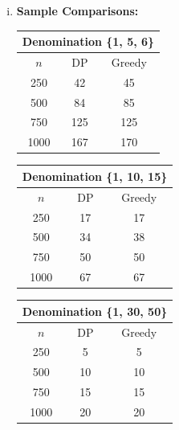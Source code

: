 \documentclass[11pt]{article}
\begin{document}
\begin{enumerate}
\begin{enumerate}[(a)]
\begin{enumerate}[(i)]
				\item
					\textbf{Sample Comparisons:} \\
						\hspace*{.5cm}
						\begin{tabular}{ |c||c|c| }
							\hline
							\multicolumn{3}{|c|}{\textbf{Denomination \{1, 5, 6\}}} \\
							\hline
							$ n $ & DP & Greedy \\
							\hline
							250 & 42 & 45 \\
							\hline
							500 & 84 & 85 \\ 
							\hline
							750 & 125 & 125 \\ 
							\hline
							1000 & 167 & 170 \\
							\hline
						\end{tabular}
						\vspace{5mm}
						
						\hspace*{.5cm}
						\begin{tabular}{ |c||c|c| }
							\hline
							\multicolumn{3}{|c|}{\textbf{Denomination \{1, 10, 15\}}} \\
							\hline
							$ n $ & DP & Greedy \\
							\hline
							250 & 17 & 17 \\
							\hline
							500 & 34 & 38 \\ 
							\hline
							750 & 50 & 50 \\ 
							\hline
							1000 & 67 & 67 \\
							\hline
						\end{tabular}
						\vspace{5mm}

						\hspace*{.5cm}
						\begin{tabular}{ |c||c|c| }
							\hline
							\multicolumn{3}{|c|}{\textbf{Denomination \{1, 30, 50\}}} \\
							\hline
							$ n $ & DP & Greedy \\
							\hline
							250 & 5 & 5 \\
							\hline
							500 & 10 & 10 \\ 
							\hline
							750 & 15 & 15 \\ 
							\hline
							1000 & 20 & 20 \\
							\hline
						\end{tabular}
						\vspace{5mm}
					

\end{enumerate}
\end{enumerate}
\end{enumerate}
\end{document}

